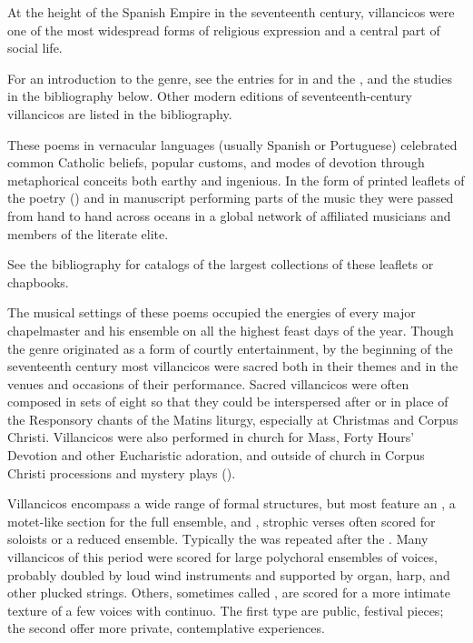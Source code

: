 
At the height of the Spanish Empire in the seventeenth century,
villancicos were one of the most widespread forms of religious expression and a central part of social life.%
  \begin{Footnote}
  For an introduction to the genre, see the entries for  in  and the , and the studies in the bibliography below.
  Other modern editions of seventeenth-century villancicos are listed in the bibliography.
  \end{Footnote}
These poems in vernacular languages (usually Spanish or Portuguese) celebrated common Catholic beliefs, popular customs, and modes of devotion through metaphorical conceits both earthy and ingenious.
In the form of printed leaflets of the poetry () and in manuscript performing parts of the music they were passed from hand to hand across oceans in a global network of affiliated musicians and members of the literate elite.%
  \begin{Footnote}
  See the bibliography for catalogs of the largest collections of these leaflets or chapbooks.
  \end{Footnote}

The musical settings of these poems occupied the energies of every major chapelmaster and his ensemble on all the highest feast days of the year.
Though the genre originated as a form of courtly entertainment, by the beginning of the seventeenth century most villancicos were sacred both in their themes and in the venues and occasions of their performance.
Sacred villancicos were often composed in sets of eight so that they could be interspersed after or in place of the Responsory chants of the Matins liturgy, especially at Christmas and Corpus Christi.
Villancicos were also performed in church for Mass, Forty Hours' Devotion and other Eucharistic adoration, and outside of church in Corpus Christi processions and mystery plays ().

Villancicos encompass a wide range of formal structures, but most feature an , a motet-like section for the full ensemble, and , strophic verses often scored for soloists or a reduced ensemble.
Typically the  was repeated after the .
Many villancicos of this period were scored for large polychoral ensembles of voices, probably doubled by loud wind instruments and supported by organ, harp, and other plucked strings.
Others, sometimes called , are scored for a more intimate texture of a few voices with continuo.
The first type are public, festival pieces; the second offer more private, contemplative experiences.

